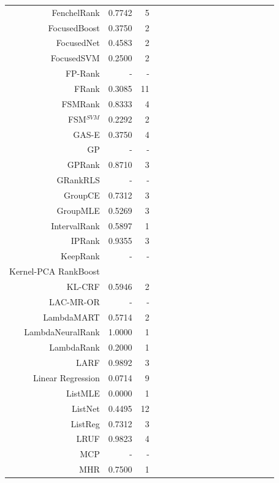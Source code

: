 \documentclass{sig-alternate-2013}
\begin{document}
\begin{longtable}{@{}rrrrrrrrrrrrrrrrr@{}}
FenchelRank & 0.7742 & 5 && & && & && & && & & \\
FocusedBoost & 0.3750 & 2 && & && & && & && & & \\
FocusedNet & 0.4583 & 2 && & && & && & && & & \\
FocusedSVM & 0.2500 & 2 && & && & && & && & & \\
FP-Rank & - & - && & && & && & && & & \\
FRank & 0.3085 & 11 && & && & && & && & & \\
FSMRank & 0.8333 & 4 && & && & && & && & & \\
FSM$^{SVM}$ & 0.2292 & 2 && & && & && & && & & \\
GAS-E & 0.3750 & 4 && & && & && & && & & \\
GP & - & - && & && & && & && & & \\
GPRank & 0.8710 & 3 && & && & && & && & & \\
GRankRLS & - & - && & && & && & && & & \\
GroupCE & 0.7312 & 3 && & && & && & && & & \\
GroupMLE & 0.5269 & 3 && & && & && & && & & \\
IntervalRank & 0.5897 & 1 && & && & && & && & & \\
IPRank & 0.9355 & 3 && & && & && & && & & \\
KeepRank & - & - && & && & && & && & & \\
Kernel-PCA RankBoost & & && & && & && & && & & \\
KL-CRF & 0.5946 & 2 && & && & && & && & & \\
LAC-MR-OR & - & - && & && & && & && & & \\
LambdaMART & 0.5714 & 2 && & && & && & && & & \\
LambdaNeuralRank & 1.0000 & 1 && & && & && & && & & \\
LambdaRank & 0.2000 & 1 && & && & && & && & & \\
LARF & 0.9892 & 3 && & && & && & && & & \\
Linear Regression & 0.0714 & 9 && & && & && & && & & \\
ListMLE & 0.0000 & 1 && & && & && & && & & \\
ListNet & 0.4495 & 12 && & && & && & && & & \\
ListReg & 0.7312 & 3 && & && & && & && & & \\
LRUF & 0.9823 & 4 && & && & && & && & & \\
MCP & - & - && & && & && & && & & \\
MHR & 0.7500 & 1 && & && & && & && & & \\

\end{longtable}
\end{document}
